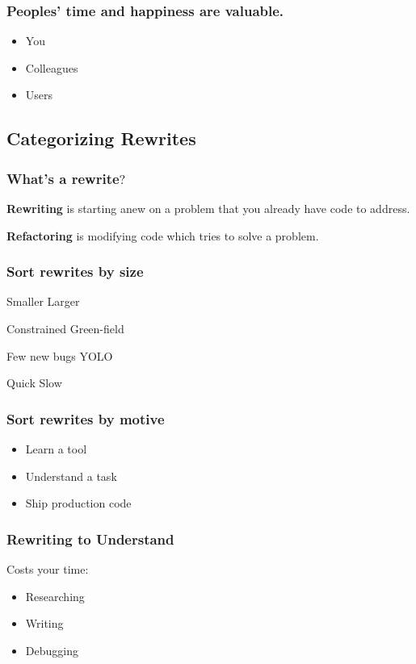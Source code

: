 \documentclass{beamer}
\begin{document}
\begin{frame}[fragile]
\frametitle{Peoples' \textbf{time} and \textbf{happiness} are valuable.}
\begin{itemize}[<+(1)->]
\item You
\item Colleagues
\item Users
\end{itemize}
\end{frame}

\subsection{Categorizing Rewrites}

\begin{frame}[fragile]
\tableofcontents[currentsubsection]
\end{frame}


\begin{frame}[fragile]
\frametitle{What's a rewrite$?$}
\textbf{Rewriting} is starting anew on a problem that you already have code to
address.

\textbf{Refactoring} is modifying code which tries to solve a problem.
\end{frame}

\begin{frame}[fragile]
\frametitle{Sort rewrites by size}
Smaller \hrulefill Larger

Constrained \hfill Green-field

Few new bugs \hfill YOLO

Quick \hfill Slow

\end{frame}

\begin{frame}[fragile]
\frametitle{Sort rewrites by motive}
\begin{itemize}[<+(1)->]
\item Learn a tool
\item Understand a task
\item Ship production code
\end{itemize}
\end{frame}

\begin{frame}[fragile]
\frametitle{Rewriting to Understand}
Costs your time:
\begin{itemize}[<+(1)->]
\item Researching
\item Writing
\item Debugging
\end{itemize}
\end{frame}
\end{document}
